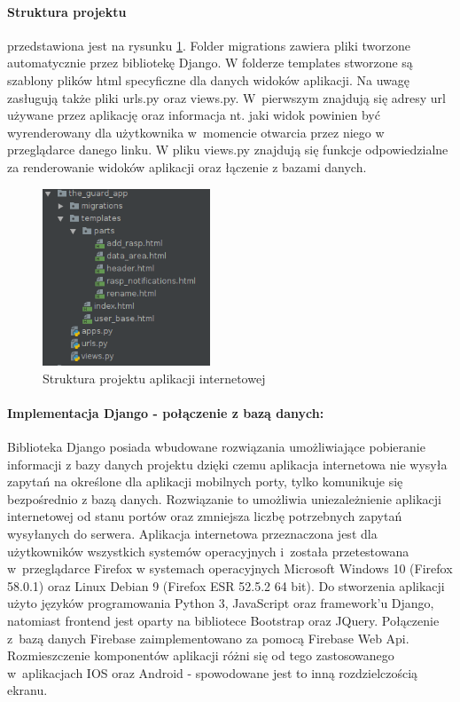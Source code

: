 \paragraph{Struktura projektu} przedstawiona jest na rysunku \ref{web_struct}. Folder migrations zawiera pliki tworzone automatycznie przez bibliotekę Django. W folderze templates stworzone są szablony plików html specyficzne dla danych widoków aplikacji. Na uwagę zasługują także pliki urls.py oraz views.py. W~pierwszym znajdują się adresy url używane przez aplikację oraz informacja nt. jaki widok powinien być wyrenderowany dla użytkownika w~momencie otwarcia przez niego w przeglądarce danego linku. W pliku views.py znajdują się funkcje odpowiedzialne za renderowanie widoków aplikacji oraz łączenie z bazami danych. 
\begin{figure}[H]
	\centering
	\includegraphics[width=5cm]{web_screenshots/web_struct.png}
	\caption{Struktura projektu aplikacji internetowej}
	\label{web_struct}
\end{figure}

\paragraph{Implementacja Django - połączenie z bazą danych:}
Biblioteka Django posiada wbudowane rozwiązania umożliwiające pobieranie informacji z bazy danych projektu dzięki czemu aplikacja internetowa nie wysyła zapytań na określone dla aplikacji mobilnych porty, tylko komunikuje się bezpośrednio z bazą danych. Rozwiązanie to umożliwia uniezależnienie aplikacji internetowej od stanu portów oraz zmniejsza liczbę potrzebnych zapytań wysyłanych do serwera.
Aplikacja internetowa przeznaczona jest dla użytkowników wszystkich systemów operacyjnych i~została przetestowana w~przeglądarce Firefox w systemach operacyjnych Microsoft Windows 10 (Firefox 58.0.1) oraz Linux Debian 9 (Firefox ESR 52.5.2 64 bit). Do stworzenia aplikacji użyto języków programowania Python 3, JavaScript oraz framework'u Django, natomiast frontend jest oparty na bibliotece Bootstrap oraz JQuery. Połączenie z~bazą danych Firebase zaimplementowano za pomocą Firebase Web Api. Rozmieszczenie komponentów aplikacji różni się od tego zastosowanego w~aplikacjach IOS oraz Android - spowodowane jest to inną rozdzielczością ekranu. 

